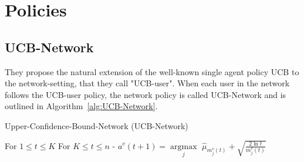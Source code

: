 \documentclass{article}
\begin{document}
\section{Policies}

\subsection{UCB-Network}

They propose the natural extension of the well-known single agent policy UCB to the network-setting, that they call "UCB-user". When each user in the network follows the UCB-user policy, the network policy is called UCB-Network and is outlined in Algorithm~\ref{alg:UCB-Network}.
\begin{algorithm}[htb]
   \caption{Upper-Confidence-Bound-Network (UCB-Network)}
   \label{alg:UCB-Network}
\begin{algorithmic}
    For $1 \leq t \leq K$
    For $K \leq t \leq n$
   \STATE - $a^v(t+1) = \underset{j}{\operatorname{argmax}} \, \, \hat{\mu}_{m_j^v(t)} + \sqrt{\frac{2 \ln t}{m_j^v(t)}}$
\end{algorithmic}
\end{algorithm}
\end{document}
